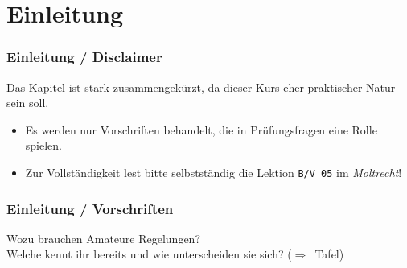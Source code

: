 


\subtitle{Betriebstechnik/Vorschriften 05:  \\
  Gesetze, Vorschriften, Regelungen \\[2em]}
\date{Stand 18.09.2017}


\section{Einleitung}

\begin{frame}
  \frametitle{Einleitung / Disclaimer}

  \begin{center}
    \Large{Das Kapitel ist stark zusammengekürzt, da dieser Kurs eher
    praktischer Natur sein soll.}
  \end{center}

  \normalsize

  \begin{itemize}
    \item Es werden nur Vorschriften behandelt, die in Prüfungsfragen eine Rolle spielen.
    \item Zur Vollständigkeit lest bitte selbstständig die Lektion \texttt{B/V 05} im
      \emph{Moltrecht}!
  \end{itemize}

\end{frame}


\begin{frame}
  \frametitle{Einleitung / Vorschriften}

  \begin{center}
    \Large{Wozu brauchen Amateure Regelungen?} \\
    \Large{Welche kennt ihr bereits und wie unterscheiden sie sich? ($\Rightarrow$~Tafel)}
  \end{center}

\end{frame}

